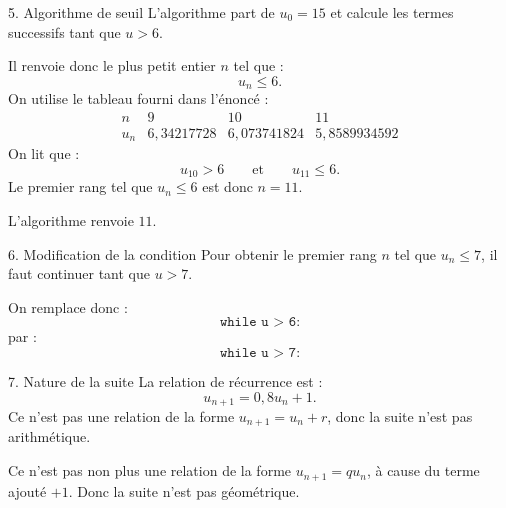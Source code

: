 \documentclass[11pt,a4paper]{article}
\newcommand{\code}[1]{\texttt{#1}}
\begin{document}
\begin{correctionbox}{5. Algorithme de seuil}
L'algorithme part de $u_0=15$ et calcule les termes successifs tant que $u>6$.

Il renvoie donc le plus petit entier $n$ tel que :
\[
 u_n\leq6.
\]
On utilise le tableau fourni dans l'énoncé :
\[
\begin{array}{c|ccc}
n&9&10&11\\ \hline
u_n&6{,}34217728&6{,}073741824&5{,}8589934592
\end{array}
\]
On lit que :
\[
 u_{10}>6
 \qquad\text{et}\qquad
 u_{11}\leq6.
\]
Le premier rang tel que $u_n\leq6$ est donc $n=11$.

L'algorithme renvoie $11$.
\end{correctionbox}

\begin{correctionbox}{6. Modification de la condition}
Pour obtenir le premier rang $n$ tel que $u_n\leq7$, il faut continuer tant que $u>7$.

On remplace donc :
\[
\code{while u > 6:}
\]
par :
\[
\code{while u > 7:}
\]
\end{correctionbox}

\begin{correctionbox}{7. Nature de la suite}
La relation de récurrence est :
\[
 u_{n+1}=0{,}8u_n+1.
\]
Ce n'est pas une relation de la forme $u_{n+1}=u_n+r$, donc la suite n'est pas arithmétique.

Ce n'est pas non plus une relation de la forme $u_{n+1}=q u_n$, à cause du terme ajouté $+1$. Donc la suite n'est pas géométrique.
\end{correctionbox}
\end{document}
